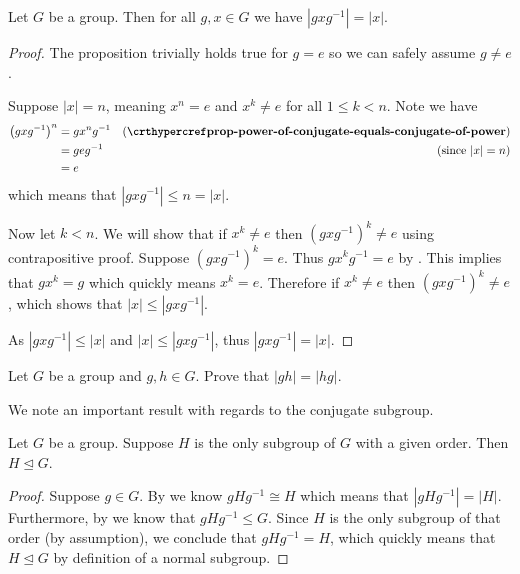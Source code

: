 \begin{proposition}\label{prop-order-of-conjugate-element-equals-order-of-element}
    Let $G$ be a group. Then for all $g, x \in G$ we have $|gxg^{-1}| = |x|$.
\end{proposition}
\begin{proof}
    The proposition trivially holds true for $g = e$ so we can safely assume $g \neq e$.

    Suppose $|x| = n$, meaning $x^n = e$ and $x^k \neq e$ for all $1 \leq k < n$. Note we have
    \begin{align*}
        \left(gxg^{-1}\right)^n  &= gx^ng^{-1} & (\myref{prop-power-of-conjugate-equals-conjugate-of-power})\\
        &= geg^{-1} & (\text{since } |x| = n)\\
        &= e
    \end{align*}
    which means that $|gxg^{-1}| \leq n = |x|$.

    Now let $k < n$. We will show that if $x^k \neq e$ then $(gxg^{-1})^k \neq e$ using contrapositive proof. Suppose $(gxg^{-1})^k = e$. Thus $gx^kg^{-1} = e$ by . This implies that $gx^k = g$ which quickly means $x^k = e$. Therefore if $x^k \neq e$ then $(gxg^{-1})^k \neq e$, which shows that $|x| \leq |gxg^{-1}|$.

    As $|gxg^{-1}| \leq |x|$ and $|x| \leq |gxg^{-1}|$, thus $|gxg^{-1}| = |x|$.
\end{proof}

\begin{exercise}
    Let $G$ be a group and $g, h \in G$. Prove that $|gh| = |hg|$.
\end{exercise}

\newpage

We note an important result with regards to the conjugate subgroup.

\begin{theorem}\label{thrm-unique-subgroup-of-given-order-is-normal}
    Let $G$ be a group. Suppose $H$ is the only subgroup of $G$ with a given order. Then $H \unlhd G$.
\end{theorem}
\begin{proof}
    Suppose $g \in G$. By  we know $gHg^{-1} \cong H$ which means that $|gHg^{-1}| = |H|$. Furthermore, by  we know that $gHg^{-1} \leq G$. Since $H$ is the only subgroup of that order (by assumption), we conclude that $gHg^{-1} = H$, which quickly means that $H \unlhd G$ by definition of a normal subgroup.
\end{proof}

